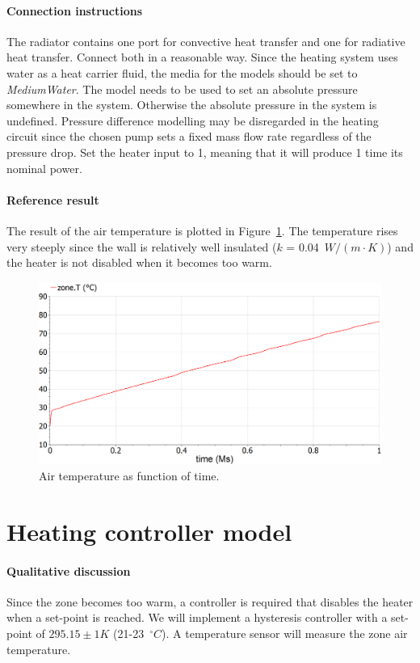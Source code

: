 \documentclass[10pt,a4paper]{article}
\begin{document}
\paragraph{Connection instructions}
The radiator contains one port for convective heat transfer and one for radiative heat transfer. Connect both in a reasonable way. Since the heating system uses water as a heat carrier fluid, the media for the models should be set to \textit{MediumWater}. The  model needs to be used to set an absolute pressure somewhere in the system. Otherwise the absolute pressure in the system is undefined. Pressure difference modelling may be disregarded in the heating circuit since the chosen pump sets a fixed mass flow rate regardless of the pressure drop. Set the heater input to 1, meaning that it will produce 1 time its nominal power.

\paragraph{Reference result}
The result of the air temperature is plotted in Figure~\ref{fig:res4}. The temperature rises very steeply since the wall is relatively well insulated ($k$ = 0.04~$W/(m\cdot K)$) and the heater is not disabled when it becomes too warm.
\begin{figure}[h]
\centering
\includegraphics[width=0.6\columnwidth]{result4.png}
\caption{Air temperature as function of time.}
\label{fig:res4}
\end{figure}


\newpage
\section{Heating controller model}
\paragraph{Qualitative discussion}
Since the zone becomes too warm, a controller is required that disables the heater when a set-point is reached. We will implement a hysteresis controller with a set-point of $295.15 \pm 1 K$ (21-23~$^{\circ}C$). A temperature sensor will measure the zone air temperature.
\end{document}
